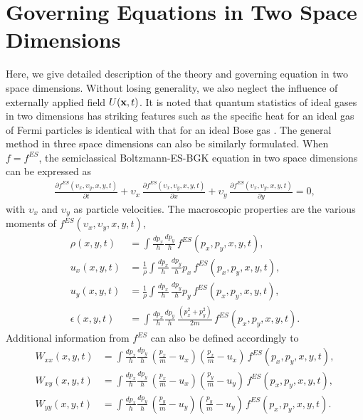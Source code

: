 \documentclass{rsproca}%
\begin{document}
\section{Governing Equations in Two Space Dimensions}
\label{sec:3}
Here, we give detailed description of the theory and governing equation in two space dimensions.  Without losing generality, we also neglect the influence of externally applied field \(U({\bf x},t)\).  It is noted that quantum statistics of ideal gases in two dimensions has striking features such as the specific heat for an ideal gas of Fermi particles is identical with that for an ideal Bose gas \cite{May1964}. The general method in three space dimensions can also be similarly formulated.   When $f=f^{ES}$, the semiclassical Boltzmann-ES-BGK equation in two space dimensions can be expressed as
\begin{align}
\frac{\partial f^{ES}({\upsilon}_x,{\upsilon}_y, x, y, t)}{\partial t} + {\upsilon}_x\,\frac{\partial f^{ES}({\upsilon}_x,{\upsilon}_y, x, y, t)}{\partial x } + {\upsilon}_y\,\frac{\partial f^{ES}({\upsilon}_x,{\upsilon}_y, x, y, t)} {\partial y} =0,
\label{eq:normalized_B_ES_BGK}
\end{align}
with ${\upsilon}_x$ and ${\upsilon}_y$ as particle velocities.   The macroscopic properties are the various moments of $f^{ES}({\upsilon}_x,{\upsilon}_y,x,y,t)$,
\begin{subequations}
\begin{align}
\rho (x,y,t) 			&= \int \frac{ d p_x}{h} \frac{ d p_y}{h} \, f^{ES}(p_x, p_y, x, y, t), \\
u_x (x,y,t) 			&= \frac{1}{\rho} \int 	 \frac{ d p_x}{h} \, \frac{ d p_y}{h}  p_x \, f^{ES}(p_x, p_y, x, y, t), \\
u_y (x,y,t) 			&= \frac{1}{\rho} \int 	 \frac{ d p_x}{h} \, \frac{ d p_y}{h}  p_y \, f^{ES}(p_x, p_y, x, y, t), \\
\epsilon (x,y,t) 	&= \int \frac{ d p_x}{h} \frac{ d p_y}{h} \, \frac{(p_x^2 + p_y^2)}{2m} \, f^{ES}(p_x, p_y, x, y, t).
\end{align}
\end{subequations}
Additional information from $f^{ES}$ can also be defined accordingly to
\begin{subequations}
\begin{align}
W_{x x}(x,y,t)	&=	\int \frac{ d p_x}{h} \frac{ d p_y}{h} \, (\frac{p_x}{m}-u_x)(\frac{p_x}{m}-u_x)\,f^{ES}(p_x, p_y, x, y, t), \\
W_{x y}(x,y,t)	&=	\int \frac{ d p_x}{h} \frac{ d p_y}{h} \, (\frac{p_x}{m}-u_x)(\frac{p_y}{m}-u_y)\,f^{ES}(p_x, p_y, x, y, t), \\
W_{y y}(x,y,t)	&=	\int \frac{ d p_x}{h} \frac{ d p_y}{h} \, (\frac{p_y}{m}-u_y)(\frac{p_y}{m}-u_y)\,f^{ES}(p_x, p_y, x, y, t).
\end{align}
\end{subequations}
\end{document}
